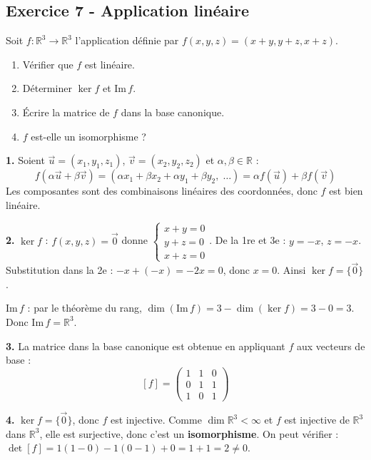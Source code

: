 \documentclass[12pt,a4paper]{article}
\begin{document}
\subsection*{Exercice 7 - Application linéaire \niveau{\difficile}}

\begin{boiteexercice}
Soit $f : \mathbb{R}^3 \to \mathbb{R}^3$ l'application définie par $f(x,y,z) = (x+y, y+z, x+z)$.
\begin{enumerate}
  \item Vérifier que $f$ est linéaire.
  \item Déterminer $\ker f$ et $\text{Im}\,f$.
  \item Écrire la matrice de $f$ dans la base canonique.
  \item $f$ est-elle un isomorphisme ?
\end{enumerate}
\end{boiteexercice}

\begin{boitecorrige}
\textbf{1.} Soient $\vec{u}=(x_1,y_1,z_1)$, $\vec{v}=(x_2,y_2,z_2)$ et $\alpha,\beta\in\mathbb{R}$ :
\[
f(\alpha\vec{u}+\beta\vec{v}) = (\alpha x_1+\beta x_2+\alpha y_1+\beta y_2,\;\ldots)
= \alpha f(\vec{u})+\beta f(\vec{v})
\]
Les composantes sont des combinaisons linéaires des coordonnées, donc $f$ est bien linéaire.

\textbf{2.} $\ker f$ : $f(x,y,z)=\vec{0}$ donne
$\begin{cases}x+y=0\\y+z=0\\x+z=0\end{cases}$. De la 1re et 3e : $y=-x$, $z=-x$. Substitution dans la 2e : $-x+(-x)=-2x=0$, donc $x=0$. Ainsi $\ker f=\{\vec{0}\}$.

$\text{Im}\,f$ : par le théorème du rang, $\dim(\text{Im}\,f)=3-\dim(\ker f)=3-0=3$. Donc $\text{Im}\,f=\mathbb{R}^3$.

\textbf{3.} La matrice dans la base canonique est obtenue en appliquant $f$ aux vecteurs de base :
\[
[f] = \begin{pmatrix}1&1&0\\0&1&1\\1&0&1\end{pmatrix}
\]

\textbf{4.} $\ker f=\{\vec{0}\}$, donc $f$ est injective. Comme $\dim\mathbb{R}^3<\infty$ et $f$ est injective de $\mathbb{R}^3$ dans $\mathbb{R}^3$, elle est surjective, donc c'est un \textbf{isomorphisme}. On peut vérifier : $\det[f]=1(1-0)-1(0-1)+0=1+1=2\neq0$.
\end{boitecorrige}
\end{document}
